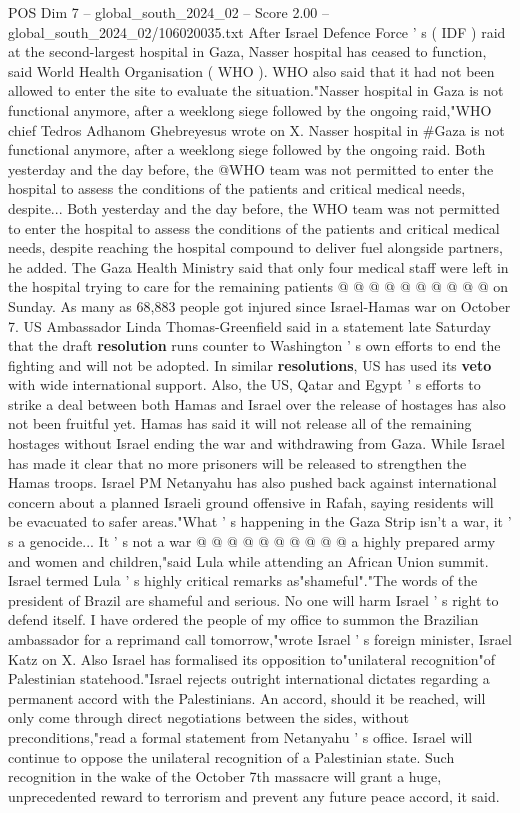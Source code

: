 \begin{textsample}{POS Dim 7 – global\_south\_2024\_02 – Score 2.00 – global\_south\_2024\_02/106020035.txt}  \label{ex:f7_pos_051}
After Israel Defence Force ' s ( IDF ) raid at the second-largest hospital in Gaza, Nasser hospital has ceased to function, said World Health Organisation ( WHO ).
WHO also said that it had not been allowed to enter the site to evaluate the situation."Nasser hospital in Gaza is not functional anymore, after a weeklong siege followed by the ongoing raid,"WHO chief Tedros Adhanom Ghebreyesus wrote on X.
Nasser hospital in \#Gaza is not functional anymore, after a weeklong siege followed by the ongoing raid.
Both yesterday and the day before, the @WHO team was not permitted to enter the hospital to assess the conditions of the patients and critical medical needs, despite...
Both yesterday and the day before, the WHO team was not permitted to enter the hospital to assess the conditions of the patients and critical medical needs, despite reaching the hospital compound to deliver fuel alongside partners, he added.
The Gaza Health Ministry said that only four medical staff were left in the hospital trying to care for the remaining patients @ @ @ @ @ @ @ @ @ @ on Sunday.
As many as 68,883 people got injured since Israel-Hamas war on October 7.
US Ambassador Linda Thomas-Greenfield said in a statement late Saturday that the draft \textbf{resolution} runs counter to Washington ' s own efforts to end the fighting and will not be adopted.
In similar \textbf{resolutions}, US has used its \textbf{veto} with wide international support.
Also, the US, Qatar and Egypt ' s efforts to strike a deal between both Hamas and Israel over the release of hostages has also not been fruitful yet.
Hamas has said it will not release all of the remaining hostages without Israel ending the war and withdrawing from Gaza.
While Israel has made it clear that no more prisoners will be released to strengthen the Hamas troops.
Israel PM Netanyahu has also pushed back against international concern about a planned Israeli ground offensive in Rafah, saying residents will be evacuated to safer areas."What ' s happening in the Gaza Strip isn't a war, it ' s a genocide...
It ' s not a war @ @ @ @ @ @ @ @ @ @ a highly prepared army and women and children,"said Lula while attending an African Union summit.
Israel termed Lula ' s highly critical remarks as"shameful"."The words of the president of Brazil are shameful and serious.
No one will harm Israel ' s right to defend itself.
I have ordered the people of my office to summon the Brazilian ambassador for a reprimand call tomorrow,"wrote Israel ' s foreign minister, Israel Katz on X.
Also Israel has formalised its opposition to"unilateral recognition"of Palestinian statehood."Israel rejects outright international dictates regarding a permanent accord with the Palestinians.
An accord, should it be reached, will only come through direct negotiations between the sides, without preconditions,"read a formal statement from Netanyahu ' s office.
Israel will continue to oppose the unilateral recognition of a Palestinian state.
Such recognition in the wake of the October 7th massacre will grant a huge, unprecedented reward to terrorism and prevent any future peace accord, it said.

\end{textsample}
